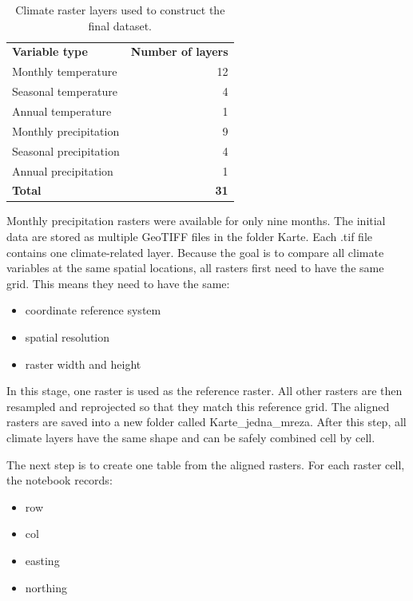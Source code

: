 \documentclass[11pt]{article}
\begin{document}
\begin{table}[H]
  \centering
  \label{tab:climate_layers}
  \begin{tabular}{lr}
    \textbf{Variable type} & \textbf{Number of layers} \\
      Monthly temperature      & 12 \\
      Seasonal temperature     & 4  \\
      Annual temperature       & 1  \\
      Monthly precipitation    & 9  \\
      Seasonal precipitation   & 4  \\
      Annual precipitation     & 1  \\
    \textbf{Total}           & \textbf{31} \\
  \end{tabular}
  \caption{Climate raster layers used to construct the final dataset.}
\end{table}


Monthly precipitation rasters were available for only nine months. The initial data are stored as multiple GeoTIFF files in the folder Karte. Each .tif file contains one climate-related layer. Because the goal is to compare all climate variables at the same spatial locations, all rasters first need to have the same grid. This means they need to have the same:

\begin{itemize}
  \item coordinate reference system
  \item spatial resolution
  \item raster width and height
\end{itemize}

In this stage, one raster is used as the reference raster. All other rasters are then resampled and reprojected so that they match this reference grid. The aligned rasters are saved into a new folder called Karte\_jedna\_mreza. After this step, all climate layers have the same shape and can be safely combined cell by cell.

The next step is to create one table from the aligned rasters. For each raster cell, the notebook records:

\begin{itemize}
  \item row
  \item col
  \item easting
  \item northing
\end{itemize}
\end{document}
